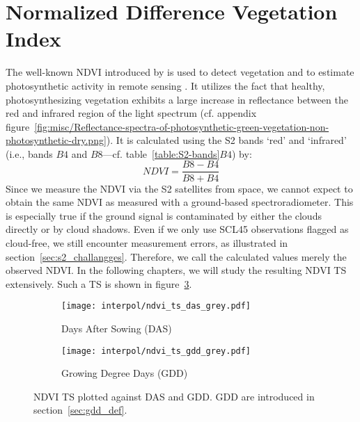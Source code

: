 \section{Normalized Difference Vegetation Index}{%
	The well-known {NDVI} introduced by \cite{rouseMonitoringVernalAdvancement1974} is used to detect vegetation and to estimate photosynthetic activity in remote sensing \citep{gamonRelationshipsNDVICanopy1995a}. It utilizes the fact that healthy, photosynthesizing vegetation exhibits a large increase in reflectance between the red and infrared region of the light spectrum (cf. appendix figure~\ref{fig:misc/Reflectance-spectra-of-photosynthetic-green-vegetation-non-photosynthetic-dry.png}). It is calculated using the S2 bands `red' and `infrared' (i.e., bands $B4$ and $B8$---cf. table~\ref{table:S2-bands}$B4$) by:
	\begin{equation}
		NDVI = \frac{B8 - B4}{B8 + B4}
		\label{eq:ndvi}
	\end{equation}
	Since we measure the NDVI via the S2 satellites from space, we cannot expect to obtain the same NDVI as measured with a ground-based spectroradiometer. This is especially true if the ground signal is contaminated by either the clouds directly or by cloud shadows. Even if we only use SCL45 observations flagged as cloud-free, we still encounter measurement errors, as illustrated in section~\ref{sec:s2_challangges}. Therefore, we call the calculated values merely the {observed NDVI}. In the following chapters, we will study the resulting NDVI {TS} extensively. Such a {TS} is shown in figure~\ref{fig:raw_ndvi_ts}.
	\begin{figure}[!h]
		\centering
		\begin{subfigure}{.47\textwidth}
			\texttt{[image: interpol/ndvi\_ts\_das\_grey.pdf]}
			\caption{Days After Sowing (DAS)}
			\label{interpol/ndvi_ts_das_grey.pdf}
		\end{subfigure}%
		\hfill
		\begin{subfigure}{.47\textwidth}
			\texttt{[image: interpol/ndvi\_ts\_gdd\_grey.pdf]}
			\caption{Growing Degree Days (GDD)}
			\label{interpol/ndvi_ts_gdd_grey.pdf}
		\end{subfigure}
		\vspace{0.3cm}
		\caption[NDVI {TS} plotted against DAS and GDD]{NDVI {TS} plotted against DAS and GDD. GDD are introduced in section~\ref{sec:gdd_def}.}
		\label{fig:raw_ndvi_ts}
	\end{figure}
}

